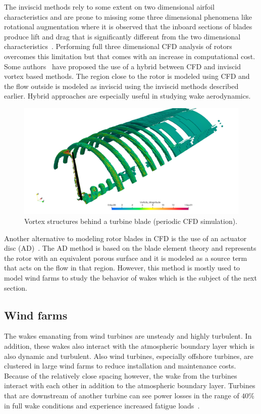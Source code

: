 The inviscid methods rely to some extent on two dimensional airfoil characteristics and are prone to missing some three dimensional phenomena like rotational augmentation where it is observed that the inboard sections of blades produce lift and drag that is significantly different from the two dimensional characteristics~\cite{sumner2010cfd, schreck2002rotational}. Performing full three dimensional CFD analysis of rotors overcomes this limitation but that comes with an increase in computational cost. Some authors~\cite{xu2002development, schmitz2005parallelized} have proposed the use of a hybrid between CFD and inviscid vortex based methods. The region close to the rotor is modeled using CFD and the flow outside is modeled as inviscid using the inviscid methods described earlier. Hybrid approaches are especially useful in studying wake aerodynamics. 
\begin{figure}[h!]
\centering
\captionsetup{justification=centering}
\includegraphics[width=\textwidth]{ch1_introduction/images/turbine_wake_picture2.png}
\caption{Vortex structures behind a turbine blade (periodic CFD simulation).}
 \label{fig:rotor}
\end{figure} 

Another alternative to modeling rotor blades in CFD is the use of an actuator disc (AD)~\cite{aagaard1982actuator, rajagopalan1985finite}. The AD method is based on the blade element theory and represents the rotor with an equivalent porous surface and it is modeled as a source term that acts on the flow in that region. However, this method is mostly used to model wind farms to study the behavior of wakes which is the subject of the next section.

\subsection{Wind farms} 
The wakes emanating from wind turbines are unsteady and highly turbulent. In addition, these wakes also interact with the atmospheric boundary layer which is also dynamic and turbulent. Also wind turbines, especially offshore turbines, are clustered in large wind farms to reduce installation and maintenance costs. Because of the relatively close spacing however, the wake from the turbines interact with each other in addition to the atmospheric boundary layer. Turbines that are downstream of another turbine can see power losses in the range of $40\%$ in full wake conditions and experience increased fatigue loads~\cite{porte2020wind, stevensreview, sandresereview}.

